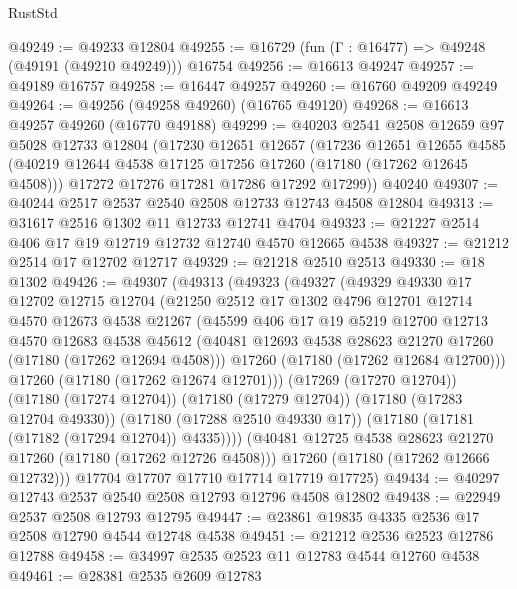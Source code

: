 \begin{lexlean}{RustStd}
\begin{coremodule}
{\begin{coremodule}
{{{{{{{{{{{{{{{{{{{{{{{{{{{{{{{{{{{{{{{{{{{{{{{{{{{{{{{@49249 := @49233 @12804
@49255 := @16729 (fun (Γ : @16477) => @49248 (@49191 (@49210 @49249))) @16754
@49256 := @16613 @49247
@49257 := @49189 @16757
@49258 := @16447 @49257
@49260 := @16760 @49209 @49249
@49264 := @49256 (@49258 @49260) (@16765 @49120)
@49268 := @16613 @49257 @49260 (@16770 @49188)
@49299 := @40203
    @2541
    @2508
    @12659
    @97
    @5028
    @12733
    @12804
    (@17230
      @12651
      @12657
      (@17236
        @12651
        @12655
        @4585
        (@40219 @12644 @4538 @17125 @17256 @17260 (@17180 (@17262 @12645 @4508)))
        @17272
        @17276
        @17281
        @17286
        @17292
        @17299))
    @40240
@49307 := @40244 @2517 @2537 @2540 @2508 @12733 @12743 @4508 @12804
@49313 := @31617 @2516 @1302 @11 @12733 @12741 @4704
@49323 := @21227 @2514 @406 @17 @19 @12719 @12732 @12740 @4570 @12665 @4538
@49327 := @21212 @2514 @17 @12702 @12717
@49329 := @21218 @2510 @2513
@49330 := @18 @1302
@49426 := @49307
    (@49313
      (@49323
        (@49327
          (@49329
            @49330
            @17
            @12702
            @12715
            @12704
            (@21250
              @2512
              @17
              @1302
              @4796
              @12701
              @12714
              @4570
              @12673
              @4538
              @21267
              (@45599
                @406
                @17
                @19
                @5219
                @12700
                @12713
                @4570
                @12683
                @4538
                @45612
                (@40481 @12693 @4538 @28623 @21270 @17260 (@17180 (@17262 @12694 @4508)))
                @17260
                (@17180 (@17262 @12684 @12700)))
              @17260
              (@17180 (@17262 @12674 @12701)))
            (@17269 (@17270 @12704))
            (@17180 (@17274 @12704))
            (@17180 (@17279 @12704))
            (@17180 (@17283 @12704 @49330))
            (@17180 (@17288 @2510 @49330 @17))
            (@17180 (@17181 (@17182 (@17294 @12704)) @4335))))
        (@40481 @12725 @4538 @28623 @21270 @17260 (@17180 (@17262 @12726 @4508)))
        @17260
        (@17180 (@17262 @12666 @12732)))
      @17704
      @17707
      @17710
      @17714
      @17719
      @17725)
@49434 := @40297 @12743 @2537 @2540 @2508 @12793 @12796 @4508 @12802
@49438 := @22949 @2537 @2508 @12793 @12795
@49447 := @23861 @19835 @4335 @2536 @17 @2508 @12790 @4544 @12748 @4538
@49451 := @21212 @2536 @2523 @12786 @12788
@49458 := @34997 @2535 @2523 @11 @12783 @4544 @12760 @4538
@49461 := @28381 @2535 @2609 @12783
}}}}}}}}}}}}}}}}}}}}}}}}}}}}}}}}}}}}}}}}}}}}}}}}}}}}}}}
\end{coremodule}}
\end{coremodule}
\end{lexlean}
